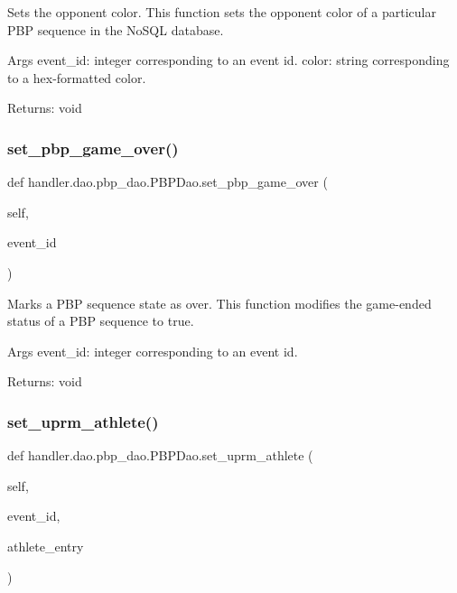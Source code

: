 \begin{DoxyVerb}Sets the opponent color.
This function sets the opponent color of a particular PBP sequence in the NoSQL database.

Args
    event_id: integer corresponding to an event id.
    color: string corresponding to a hex-formatted color.

Returns:
    void
\end{DoxyVerb}
 \mbox{\label{classhandler_1_1dao_1_1pbp__dao_1_1_p_b_p_dao_a02048c0945e96af5c39c556f8786c8ce}} 
\subsubsection{\texorpdfstring{set\+\_\+pbp\+\_\+game\+\_\+over()}{set\_pbp\_game\_over()}}
{\footnotesize\ttfamily def handler.\+dao.\+pbp\+\_\+dao.\+P\+B\+P\+Dao.\+set\+\_\+pbp\+\_\+game\+\_\+over (\begin{DoxyParamCaption}\item[{}]{self,  }\item[{}]{event\+\_\+id }\end{DoxyParamCaption})}

\begin{DoxyVerb}Marks a PBP sequence state as over.
This function modifies the game-ended status of a PBP sequence to true.

Args
    event_id: integer corresponding to an event id.

Returns:
    void
\end{DoxyVerb}
 \mbox{\label{classhandler_1_1dao_1_1pbp__dao_1_1_p_b_p_dao_a9796b031f3f16f8edd59b6b52ed18a39}} 
\subsubsection{\texorpdfstring{set\+\_\+uprm\+\_\+athlete()}{set\_uprm\_athlete()}}
{\footnotesize\ttfamily def handler.\+dao.\+pbp\+\_\+dao.\+P\+B\+P\+Dao.\+set\+\_\+uprm\+\_\+athlete (\begin{DoxyParamCaption}\item[{}]{self,  }\item[{}]{event\+\_\+id,  }\item[{}]{athlete\+\_\+entry }\end{DoxyParamCaption})}

